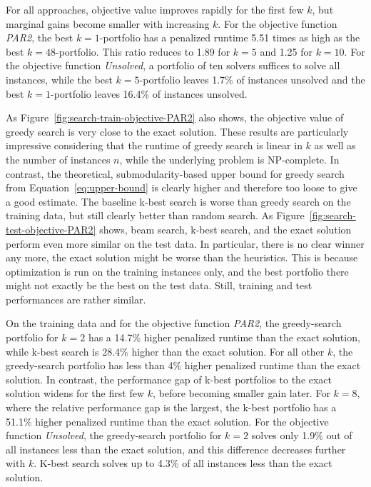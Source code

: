 \documentclass[conference]{IEEEtran}
\begin{document}
For all approaches, objective value improves rapidly for the first few $k$, but marginal gains become smaller with increasing $k$.
For the objective function \emph{PAR2}, the best $k=1$-portfolio has a penalized runtime 5.51 times as high as the best $k=48$-portfolio.
This ratio reduces to 1.89 for $k=5$ and 1.25 for $k=10$.
For the objective function \emph{Unsolved}, a portfolio of ten solvers suffices to solve all instances, while the best $k=5$-portfolio leaves 1.7\% of instances unsolved and the best $k=1$-portfolio leaves 16.4\% of instances unsolved.

As Figure~\ref{fig:search-train-objective-PAR2} also shows, the objective value of greedy search is very close to the exact solution.
These results are particularly impressive considering that the runtime of greedy search is linear in $k$ as well as the number of instances $n$, while the underlying problem is NP-complete.
In contrast, the theoretical, submodularity-based upper bound for greedy search from Equation~\ref{eq:upper-bound} is clearly higher and therefore too loose to give a good estimate.
The baseline k-best search is worse than greedy search on the training data, but still clearly better than random search.
As Figure~\ref{fig:search-test-objective-PAR2} shows, beam search, k-best search, and the exact solution perform even more similar on the test data.
In particular, there is no clear winner any more, the exact solution might be worse than the heuristics.
This is because optimization is run on the training instances only, and the best portfolio there might not exactly be the best on the test data.
Still, training and test performances are rather similar.

On the training data and for the objective function \emph{PAR2}, the greedy-search portfolio for $k=2$ has a 14.7\% higher penalized runtime than the exact solution, while k-best search is 28.4\% higher than the exact solution.
For all other $k$, the greedy-search portfolio has less than 4\% higher penalized runtime than the exact solution.
In contrast, the performance gap of k-best portfolios to the exact solution widens for the first few $k$, before becoming smaller gain later.
For $k=8$, where the relative performance gap is the largest, the k-best portfolio has a 51.1\% higher penalized runtime than the exact solution.
For the objective function \emph{Unsolved}, the greedy-search portfolio for $k=2$ solves only 1.9\% out of all instances less than the exact solution, and this difference decreases further with $k$.
K-best search solves up to 4.3\% of all instances less than the exact solution.
\end{document}
